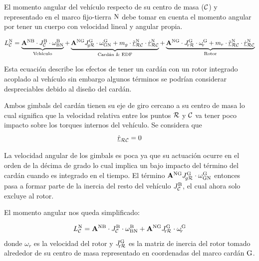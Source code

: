 El momento angular del vehículo respecto de su centro de masa ($\mathcal{C}$) y representado en el marco fijo-tierra $\mathrm{N}$ debe tomar en cuenta el momento angular por tener un cuerpo con velocidad lineal y angular propia. 

\begin{equation}
		L_{\mathcal{C}}^{\mathrm{N}} = \underbrace{\mathbf{A}^{\mathrm{{NB}}} \cdot J_{\mathcal{C}}^{\mathrm{B}} \cdot \omega_{\mathrm{BN}}^{\mathrm{B}}}_{\text{Vehículo}} + \underbrace{\mathbf{A}^{\mathrm{{NG}}}J_{\!g\mathcal{R}}^{\mathrm{G}} \cdot \omega_{\mathrm{GN}}^{\mathrm{G}} +
		 m_{g}\cdot \tilde{{ \underline{r} }}^{\mathrm{N}}_{\mathcal{RC}} \cdot\dot{{ \underline{r} }}^{\mathrm{N}}_{\mathcal{RC}} }_\text{Cardán \& EDF} + \underbrace{ \mathbf{A}^{\mathrm{NG}} \cdot J_{\!r\mathcal{R}}^{\mathrm{G}} \cdot \omega_{\!r}^{\mathrm{G}} + m_{r}\cdot \tilde{{ \underline{r} }}^{\mathrm{N}}_{\mathcal{RC}} \cdot\dot{{ \underline{r} }}^{\mathrm{N}}_{\mathcal{RC}}}_\text{Rotor}
\end{equation}

Esta ecuación describe los efectos de tener un cardán con un rotor integrado acoplado al vehículo sin embargo algunos términos se podrían considerar despreciables debido al diseño del cardán. 

Ambos gimbals del cardán tienen su eje de giro cercano a su centro de masa lo cual significa que la velocidad relativa entre los puntos $\mathcal{R}$ y $\mathcal{C}$ va tener poco impacto sobre los torques internos del vehículo. Se considera que
\begin{equation}
\dot{{ \underline{r} }}_{\mathcal{RC}}  = 0
\end{equation}

La velocidad angular de los gimbals es poca ya que su actuación ocurre en el orden de la décima de grado lo cual implica un bajo impacto del término del cardán cuando es integrado en el tiempo. El término  $\mathbf{A}^{\mathrm{{NG}}}J_{\!g\mathcal{R}}^{\mathrm{G}} \cdot \omega_{\mathrm{GN}}^{\mathrm{G}}$ entonces pasa a formar parte de la inercia del resto del vehículo $J_{\mathcal{C}}^{\mathrm{B}}$, el cual ahora solo excluye al rotor.



El momento angular nos queda simplificado:


\begin{equation}
	L_{\mathcal{C}}^{\mathrm{N}} = \mathbf{A}^{\mathrm{{NB}}} \cdot J_{\mathcal{C}}^{\mathrm{B}} \cdot \omega_{\mathrm{BN}}^{\mathrm{B}} +\mathbf{A}^{\mathrm{NG}} J_{\mathcal{\!\mathrm{r}R}}^{\mathrm{G}} \cdot \omega_{\!r}^{\mathrm{G}}
\end{equation}
donde $\omega_{\!r}$ es la velocidad del rotor y $J_{\mathcal{\!\mathrm{r}R}}^{\mathrm{G}}$ es la matriz de inercia del rotor tomado alrededor de su centro de masa representado en coordenadas del marco cardán $\mathrm{G}$.


